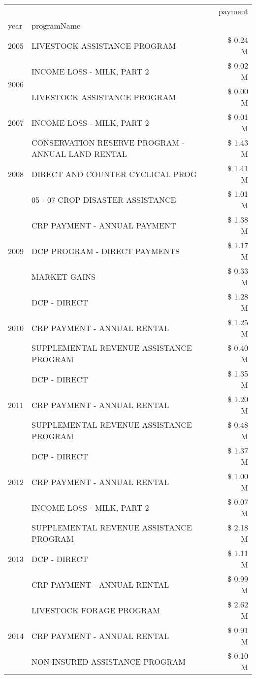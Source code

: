 \begin{tabular}{llr}
\toprule
 &  & payment \\
year & programName &  \\
\midrule
2005 & LIVESTOCK ASSISTANCE PROGRAM & \$ 0.24 M \\
\cline{1-3}
\multirow[t]{2}{*}{2006} & INCOME LOSS - MILK, PART 2 & \$ 0.02 M \\
 & LIVESTOCK ASSISTANCE PROGRAM & \$ 0.00 M \\
\cline{1-3}
2007 & INCOME LOSS - MILK, PART 2 & \$ 0.01 M \\
\cline{1-3}
\multirow[t]{3}{*}{2008} & CONSERVATION RESERVE PROGRAM - ANNUAL LAND RENTAL & \$ 1.43 M \\
 & DIRECT AND COUNTER CYCLICAL PROG & \$ 1.41 M \\
 & 05 - 07 CROP DISASTER ASSISTANCE & \$ 1.01 M \\
\cline{1-3}
\multirow[t]{3}{*}{2009} & CRP PAYMENT - ANNUAL PAYMENT & \$ 1.38 M \\
 & DCP PROGRAM - DIRECT PAYMENTS & \$ 1.17 M \\
 & MARKET GAINS & \$ 0.33 M \\
\cline{1-3}
\multirow[t]{3}{*}{2010} & DCP - DIRECT & \$ 1.28 M \\
 & CRP PAYMENT - ANNUAL RENTAL & \$ 1.25 M \\
 & SUPPLEMENTAL REVENUE ASSISTANCE PROGRAM & \$ 0.40 M \\
\cline{1-3}
\multirow[t]{3}{*}{2011} & DCP - DIRECT & \$ 1.35 M \\
 & CRP PAYMENT - ANNUAL RENTAL & \$ 1.20 M \\
 & SUPPLEMENTAL REVENUE ASSISTANCE PROGRAM & \$ 0.48 M \\
\cline{1-3}
\multirow[t]{3}{*}{2012} & DCP - DIRECT & \$ 1.37 M \\
 & CRP PAYMENT - ANNUAL RENTAL & \$ 1.00 M \\
 & INCOME LOSS - MILK, PART 2 & \$ 0.07 M \\
\cline{1-3}
\multirow[t]{3}{*}{2013} & SUPPLEMENTAL REVENUE ASSISTANCE PROGRAM & \$ 2.18 M \\
 & DCP - DIRECT & \$ 1.11 M \\
 & CRP PAYMENT - ANNUAL RENTAL & \$ 0.99 M \\
\cline{1-3}
\multirow[t]{3}{*}{2014} & LIVESTOCK FORAGE PROGRAM & \$ 2.62 M \\
 & CRP PAYMENT - ANNUAL RENTAL & \$ 0.91 M \\
 & NON-INSURED ASSISTANCE PROGRAM & \$ 0.10 M \\

\end{tabular}
